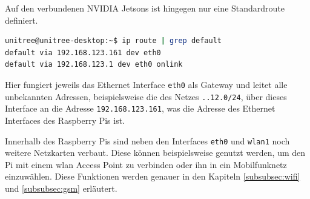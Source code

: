 Auf den verbundenen NVIDIA Jetsons ist hingegen nur eine Standardroute definiert.

\begin{lstlisting}[language=Bash]
unitree@unitree-desktop:~$ ip route | grep default
default via 192.168.123.161 dev eth0
default via 192.168.123.1 dev eth0 onlink
\end{lstlisting}

\noindent Hier fungiert jeweils das Ethernet Interface \texttt{eth0} als Gateway und leitet alle unbekannten Adressen,
beispielsweise die des Netzes \texttt{..12.0/24}, über dieses Interface an die Adresse \texttt{192.168.123.161}, was
die Adresse des Ethernet Interfaces des Raspberry Pis ist.


Innerhalb des Raspberry Pis sind neben den Interfaces \texttt{eth0} und \texttt{wlan1} noch weitere Netzkarten verbaut.
Diese können beispielsweise genutzt werden, um den Pi mit einem \gls{wlan} Access Point zu verbinden oder ihn in ein
Mobilfunknetz einzuwählen.
Diese Funktionen werden genauer in den Kapiteln \ref{subsubsec:wifi} und \ref{subsubsec:gsm} erläutert.



